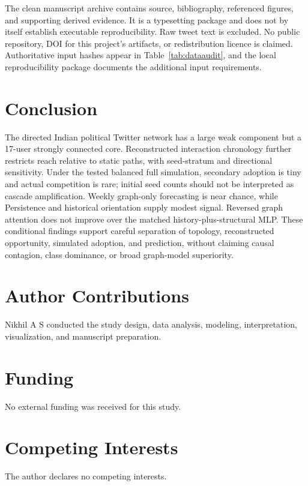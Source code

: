 \documentclass[11pt,a4paper]{article}
\begin{document}
The clean manuscript archive contains source, bibliography, referenced figures, and supporting derived evidence. It is a typesetting package and does not by itself establish executable reproducibility. Raw tweet text is excluded. No public repository, DOI for this project's artifacts, or redistribution licence is claimed. Authoritative input hashes appear in Table~\ref{tab:dataaudit}, and the local reproducibility package documents the additional input requirements.

\section{Conclusion}
The directed Indian political Twitter network has a large weak component but a 17-user strongly connected core. Reconstructed interaction chronology further restricts reach relative to static paths, with seed-stratum and directional sensitivity. Under the tested balanced full simulation, secondary adoption is tiny and actual competition is rare; initial seed counts should not be interpreted as cascade amplification. Weekly graph-only forecasting is near chance, while Persistence and historical orientation supply modest signal. Reversed graph attention does not improve over the matched history-plus-structural MLP. These conditional findings support careful separation of topology, reconstructed opportunity, simulated adoption, and prediction, without claiming causal contagion, class dominance, or broad graph-model superiority.

\section*{Author Contributions}
Nikhil A S conducted the study design, data analysis, modeling, interpretation, visualization, and manuscript preparation.
\section*{Funding}
No external funding was received for this study.
\section*{Competing Interests}
The author declares no competing interests.
\nocite{*}


\end{document}
